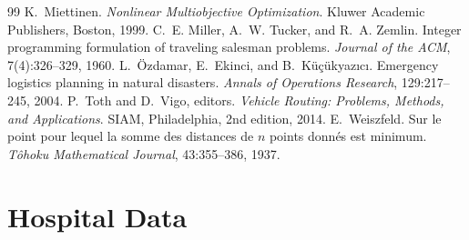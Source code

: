 \documentclass[11pt,a4paper]{article}
\theoremstyle{definition}
\begin{document}
\begin{thebibliography}{99}
 K.~Miettinen. \emph{Nonlinear Multiobjective Optimization}. Kluwer Academic Publishers, Boston, 1999.
 C.~E. Miller, A.~W. Tucker, and R.~A. Zemlin. Integer programming formulation of traveling salesman problems. \emph{Journal of the ACM}, 7(4):326--329, 1960.
 L.~{\"O}zdamar, E.~Ekinci, and B.~K{\"u}{\c{c}}{\"u}kyaz{\i}c{\i}. Emergency logistics planning in natural disasters. \emph{Annals of Operations Research}, 129:217--245, 2004.
 P.~Toth and D.~Vigo, editors. \emph{Vehicle Routing: Problems, Methods, and Applications}. SIAM, Philadelphia, 2nd edition, 2014.
 E.~Weiszfeld. Sur le point pour lequel la somme des distances de $n$ points donn{\'e}s est minimum. \emph{T{\^o}hoku Mathematical Journal}, 43:355--386, 1937.
\end{thebibliography}
\endgroup

\appendix
\section{Hospital Data}\label{app:data}
\end{document}
